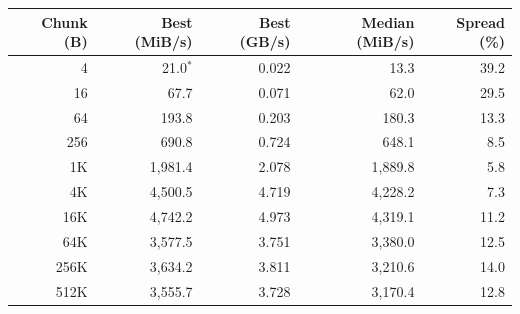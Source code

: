 \begin{tabular}{@{}rrrrr@{}}
\toprule
Chunk (B) & Best (MiB/s) & Best (GB/s) & Median (MiB/s) & Spread (\%) \\
\midrule
4 & 21.0$^{\ast}$ & 0.022 & 13.3 & 39.2 \\
16 & 67.7 & 0.071 & 62.0 & 29.5 \\
64 & 193.8 & 0.203 & 180.3 & 13.3 \\
256 & 690.8 & 0.724 & 648.1 & 8.5 \\
1K & 1{,}981.4 & 2.078 & 1{,}889.8 & 5.8 \\
4K & 4{,}500.5 & 4.719 & 4{,}228.2 & 7.3 \\
16K & 4{,}742.2 & 4.973 & 4{,}319.1 & 11.2 \\
64K & 3{,}577.5 & 3.751 & 3{,}380.0 & 12.5 \\
256K & 3{,}634.2 & 3.811 & 3{,}210.6 & 14.0 \\
512K & 3{,}555.7 & 3.728 & 3{,}170.4 & 12.8 \\
\bottomrule
\end{tabular}

